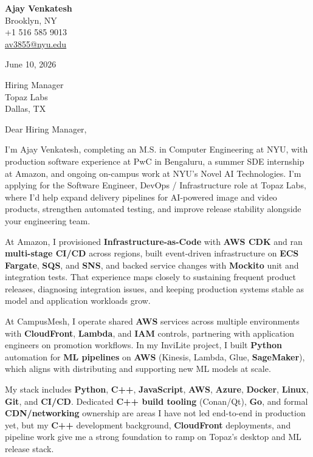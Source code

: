 \documentclass[letterpaper,11pt]{article}
\begin{document}
\begin{flushleft}
\textbf{\large Ajay Venkatesh} \\
Brooklyn, NY \\
+1 516 585 9013 \\
\href{mailto:av3855@nyu.edu}{av3855@nyu.edu}
\end{flushleft}
\vspace{10pt}
June 10, 2026
\vspace{6pt}

Hiring Manager \\
Topaz Labs \\
Dallas, TX

\vspace{10pt}

Dear Hiring Manager,

I'm Ajay Venkatesh, completing an M.S. in Computer Engineering at NYU, with production software experience at PwC in Bengaluru, a summer SDE internship at Amazon, and ongoing on-campus work at NYU's Novel AI Technologies. I'm applying for the Software Engineer, DevOps / Infrastructure role at Topaz Labs, where I'd help expand delivery pipelines for AI-powered image and video products, strengthen automated testing, and improve release stability alongside your engineering team.

At Amazon, I provisioned \textbf{Infrastructure-as-Code} with \textbf{AWS CDK} and ran \textbf{multi-stage CI/CD} across regions, built event-driven infrastructure on \textbf{ECS Fargate}, \textbf{SQS}, and \textbf{SNS}, and backed service changes with \textbf{Mockito} unit and integration tests. That experience maps closely to sustaining frequent product releases, diagnosing integration issues, and keeping production systems stable as model and application workloads grow.

At CampusMesh, I operate shared \textbf{AWS} services across multiple environments with \textbf{CloudFront}, \textbf{Lambda}, and \textbf{IAM} controls, partnering with application engineers on promotion workflows. In my InviLite project, I built \textbf{Python} automation for \textbf{ML pipelines} on \textbf{AWS} (Kinesis, Lambda, Glue, \textbf{SageMaker}), which aligns with distributing and supporting new ML models at scale.

My stack includes \textbf{Python}, \textbf{C++}, \textbf{JavaScript}, \textbf{AWS}, \textbf{Azure}, \textbf{Docker}, \textbf{Linux}, \textbf{Git}, and \textbf{CI/CD}. Dedicated \textbf{C++ build tooling} (Conan/Qt), \textbf{Go}, and formal \textbf{CDN/networking} ownership are areas I have not led end-to-end in production yet, but my \textbf{C++} development background, \textbf{CloudFront} deployments, and pipeline work give me a strong foundation to ramp on Topaz's desktop and ML release stack.
\end{document}
